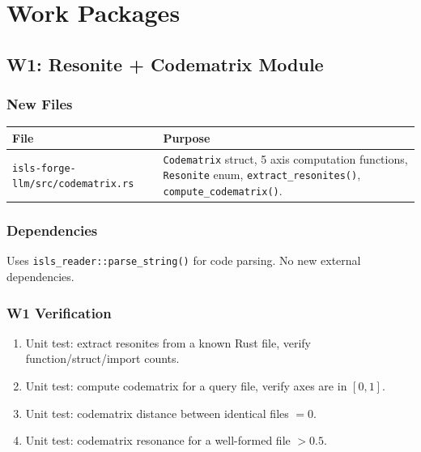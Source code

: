 \documentclass[11pt,a4paper]{article}
\begin{document}
\section{Work Packages}

\subsection{W1: Resonite + Codematrix Module}

\subsubsection{New Files}

\begin{longtable}{lp{10cm}}
\toprule
\textbf{File} & \textbf{Purpose} \\
\midrule
\texttt{isls-forge-llm/src/codematrix.rs}
  & \texttt{Codematrix} struct, 5 axis computation functions, 
    \texttt{Resonite} enum, \texttt{extract\_resonites()}, 
    \texttt{compute\_codematrix()}. \\
\bottomrule
\end{longtable}

\subsubsection{Dependencies}

Uses \texttt{isls\_reader::parse\_string()} for code parsing. 
No new external dependencies.

\subsubsection{W1 Verification}

\begin{enumerate}[nosep]
\item Unit test: extract resonites from a known Rust file, 
      verify function/struct/import counts.
\item Unit test: compute codematrix for a query file, verify 
      axes are in $[0, 1]$.
\item Unit test: codematrix distance between identical files $= 0$.
\item Unit test: codematrix resonance for a well-formed file $> 0.5$.
\end{enumerate}
\end{document}
